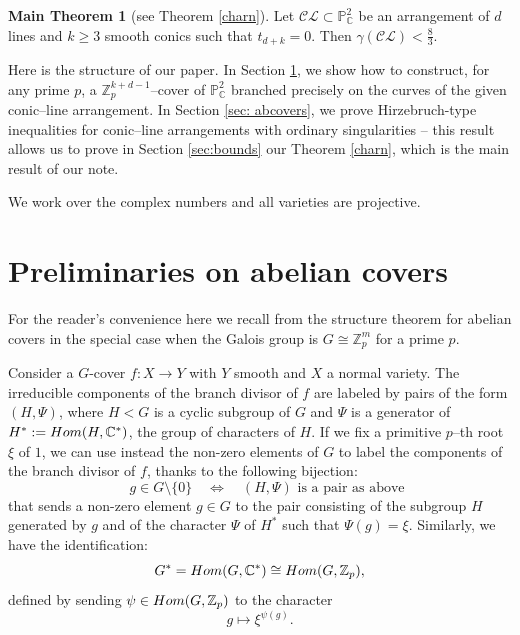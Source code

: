 \documentclass[12pt]{amsart}
\theoremstyle{plain}
\theoremstyle{definition}
\newtheorem{custom}{{\bf{Main Theorem}}}
\newcommand\pp[1]{\todo[color=cyan!50]{#1}} %
\renewcommand\geq{\geqslant}
\renewcommand\pp{\mathbb P}
\begin{document}
\begin{custom}[see Theorem \ref{charn}]
Let $\mathcal{CL} \subset \mathbb{P}^{2}_{\mathbb{C}}$ be an arrangement of $d$ lines and $k\geq 3$ smooth conics such that $t_{d+k}=0$. Then $\gamma(\mathcal{CL}) < \frac{8}{3}$.
\end{custom}

Here is the structure of our paper. In Section \ref{sec: abel-prel}, we show how to construct, for any prime $p$, a $\mathbb Z_p^{k+d-1}$--cover of $\pp^2_{\mathbb{C}}$ branched precisely on the curves of the given conic--line arrangement. In Section \ref{sec: abcovers}, we prove Hirzebruch-type inequalities for conic--line arrangements with ordinary singularities -- this result allows us to prove in Section \ref{sec:bounds} our Theorem \ref{charn}, which is the main result of our note.

We work over the complex numbers and all varieties are projective.

\section{Preliminaries on abelian covers} \label{sec: abel-prel} 
For the reader's convenience  here we  recall  from \cite[\S~2]{RP} the structure theorem for abelian covers in the special case when the Galois group is $G\cong \mathbb{Z}_{p}^{m}$ for a prime $ p$. 

Consider a $G$-cover 
$f \colon  X \rightarrow Y$ with $Y$ smooth and $X$ a normal variety. The irreducible components of the branch divisor of $f$ are labeled  by pairs of the form $(H, \Psi)$, where $H < G$ is a cyclic subgroup of $G$ and $\Psi$ is a generator of $H^*:={\rm Hom}(H,\mathbb C^*)$,  the group of characters of $H$.
 If we fix  a primitive $p$--th root $\xi$ of $1$, we can use instead the non-zero elements of $G$  to label the components of the branch divisor of $f$, thanks to  the following bijection:
$$ \quad g \in G \setminus \{0\} \quad \iff \quad (H,\Psi) \text{ is a pair as above}$$ 
that sends a non-zero element $g \in G$ to the pair consisting of the subgroup $H$ generated by $g$ and of the character $\Psi$ of $H^*$ such that $\Psi(g)=\xi$.
Similarly, we have the identification:
$$G^{*} = {\rm Hom}(G,\mathbb{C}^{*}) \cong {\rm Hom}(G, \mathbb{Z}_{p}),$$
defined by sending $\psi \in {\rm Hom}(G, \mathbb{Z}_{p})$ to the character 
$$g \mapsto \xi^{\psi(g)}.$$
\end{document}
